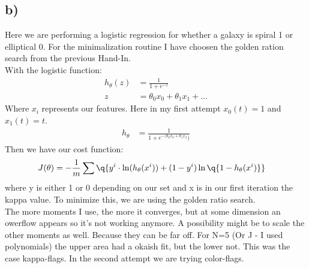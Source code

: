 \subsection{b)}
Here we are performing a logistic regression for whether a galaxy is spiral 1 or elliptical 0. For the minimalization routine I have choosen the golden ration search from the previous Hand-In. \\
With the logistic function: 
\begin{align}
    h_\theta(z) &= \frac{1}{1+e^{-z}}\\
    z &= \theta_0 x_0 + \theta_1 x_1 + ... 
\end{align}
Where $x_i$ represents our features. Here in my first attempt  $x_0(t) = 1$ and $x_{1}(t) = t$. 
\begin{align}
    h_\theta &= \frac{1}{1+e^{-(\theta_0 x_0+ \theta_1 x_2})}
\end{align}
Then we have our cost function: 
\begin{align}
    J(\theta) &= - \frac{1}{m} \sum \q{y^{i}  \cdot \ln(h_\theta (x^{i})) + (1-y^{i})\ln\q{1-h_\theta(x^{i})}}
\end{align}
where y is either 1 or 0 depending on our set and x is in our first iteration the kappa value. To minimize this, we are using the golden ratio search. \\

The more moments I use, the more it converges, but at some dimension an owerflow appears so it's not working anymore. A possibility might be to scale the other moments as well. Because they can be far off. For N=5 (Or J - I used polynomials) the upper area had a okaish fit, but the lower not. This was the case kappa-flags. 
In the second attempt we are trying color-flags.
